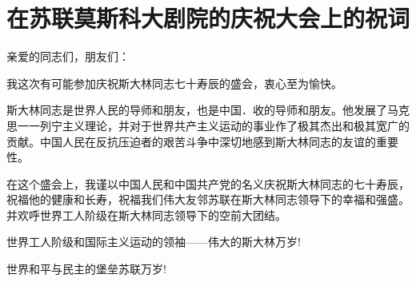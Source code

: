 \section[在苏联莫斯科大剧院的庆祝大会上的祝词（一九四九年十二月二十一日）]{在苏联莫斯科大剧院的庆祝大会上的祝词}


亲爱的同志们，朋友们：

我这次有可能参加庆祝斯大林同志七十寿辰的盛会，衷心至为愉快。

斯大林同志是世界人民的导师和朋友，也是中国．收的导师和朋友。他发展了马克思一一列宁主义理论，并对于世界共产主义运动的事业作了极其杰出和极其宽广的贡献。中国人民在反抗压迫者的艰苦斗争中深切地感到斯大林同志的友谊的重要性。

在这个盛会上，我谨以中国人民和中国共产党的名义庆祝斯大林同志的七十寿辰，祝福他的健康和长寿，祝福我们伟大友邻苏联在斯大林同志领导下的幸福和强盛。并欢呼世界工人阶级在斯大林同志领导下的空前大团结。

世界工人阶级和国际主义运动的领袖——伟大的斯大林万岁!

世界和平与民主的堡垒苏联万岁!


